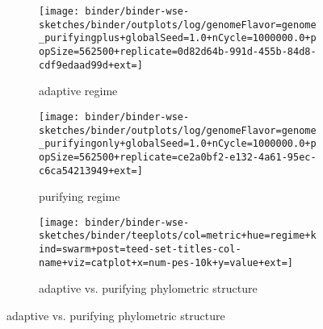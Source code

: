 \begin{figure}

\begin{subfigure}[c]{0.21\linewidth}
  \centering

  \texttt{[image: binder/binder-wse-sketches/binder/outplots/log/genomeFlavor=genome\_purifyingplus+globalSeed=1.0+nCycle=1000000.0+popSize=562500+replicate=0d82d64b-991d-455b-84d8-cdf9edaad99d+ext=]}

  \vspace{-3ex}
  \footnotesize
 \caption{\footnotesize adaptive regime}
  \label{fig:on-device-adaptive}
\end{subfigure}
\hfill
\begin{subfigure}[c]{0.21\linewidth}
  \centering

  \texttt{[image: binder/binder-wse-sketches/binder/outplots/log/genomeFlavor=genome\_purifyingonly+globalSeed=1.0+nCycle=1000000.0+popSize=562500+replicate=ce2a0bf2-e132-4a61-95ec-c6ca54213949+ext=]}

  \vspace{-3ex}
  \footnotesize
 \caption{\footnotesize purifying regime}
  \label{fig:on-device-purifying}
\end{subfigure}%
\begin{subfigure}[c]{0.53\linewidth}
  \centering
    \texttt{[image: binder/binder-wse-sketches/binder/teeplots/col=metric+hue=regime+kind=swarm+post=teed-set-titles-col-name+viz=catplot+x=num-pes-10k+y=value+ext=]}
    \vspace{-1.8ex}
    \caption{\footnotesize adaptive vs. purifying phylometric structure}
  \label{fig:on-device-phylometrics}
\end{subfigure}

\vspace{-1.5ex}


\end{figure}
